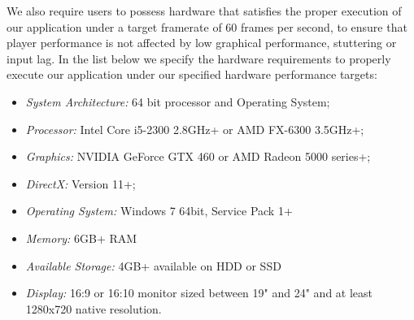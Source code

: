 We also require users to possess hardware that satisfies the proper execution of our application under a target framerate of 60 frames per second, to ensure that player performance is not affected by low graphical performance, stuttering or input lag. In the list below we specify the hardware requirements to properly execute our application under our specified hardware performance targets:
\begin{itemize}
    \item{\emph{System Architecture:} 64 bit processor and Operating System;}
    \item{\emph{Processor:} Intel Core i5-2300 2.8GHz+ or AMD FX-6300 3.5GHz+;}
    \item{\emph{Graphics:} NVIDIA GeForce GTX 460 or AMD Radeon 5000 series+;}
    \item{\emph{DirectX:} Version 11+;}
    \item{\emph{Operating System:} Windows 7 64bit, Service Pack 1+}
    \item{\emph{Memory:} 6GB+ RAM}
    \item{\emph{Available Storage:} 4GB+ available on HDD or SSD}
    \item{\emph{Display:} 16:9 or 16:10 monitor sized between 19" and 24" and at least 1280x720 native resolution.}
\end{itemize}

